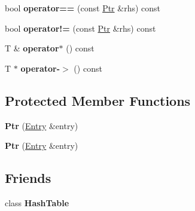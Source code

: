 \begin{DoxyCompactItemize}
\item 
\hypertarget{classjs_1_1detail_1_1_hash_table_1_1_ptr_acf66118cae167ff6aa0ae599e747eef4}{bool {\bfseries operator==} (const \hyperlink{classjs_1_1detail_1_1_hash_table_1_1_ptr}{Ptr} \&rhs) const }\label{classjs_1_1detail_1_1_hash_table_1_1_ptr_acf66118cae167ff6aa0ae599e747eef4}

\item 
\hypertarget{classjs_1_1detail_1_1_hash_table_1_1_ptr_a3fdfbcc06199bfaabc64923fd62328e7}{bool {\bfseries operator!=} (const \hyperlink{classjs_1_1detail_1_1_hash_table_1_1_ptr}{Ptr} \&rhs) const }\label{classjs_1_1detail_1_1_hash_table_1_1_ptr_a3fdfbcc06199bfaabc64923fd62328e7}

\item 
\hypertarget{classjs_1_1detail_1_1_hash_table_1_1_ptr_ab0b57a0fcf51bc62b3d21a8d1b746990}{T \& {\bfseries operator$\ast$} () const }\label{classjs_1_1detail_1_1_hash_table_1_1_ptr_ab0b57a0fcf51bc62b3d21a8d1b746990}

\item 
\hypertarget{classjs_1_1detail_1_1_hash_table_1_1_ptr_acc6d2baeb0eb449dc013088e7805f049}{T $\ast$ {\bfseries operator-\/$>$} () const }\label{classjs_1_1detail_1_1_hash_table_1_1_ptr_acc6d2baeb0eb449dc013088e7805f049}

\end{DoxyCompactItemize}
\subsection*{Protected Member Functions}
\begin{DoxyCompactItemize}
\item 
\hypertarget{classjs_1_1detail_1_1_hash_table_1_1_ptr_aa5f167c08019debfa68a9bbcfa2c5d0a}{{\bfseries Ptr} (\hyperlink{classjs_1_1detail_1_1_hash_table_entry}{Entry} \&entry)}\label{classjs_1_1detail_1_1_hash_table_1_1_ptr_aa5f167c08019debfa68a9bbcfa2c5d0a}

\item 
\hypertarget{classjs_1_1detail_1_1_hash_table_1_1_ptr_aa5f167c08019debfa68a9bbcfa2c5d0a}{{\bfseries Ptr} (\hyperlink{classjs_1_1detail_1_1_hash_table_entry}{Entry} \&entry)}\label{classjs_1_1detail_1_1_hash_table_1_1_ptr_aa5f167c08019debfa68a9bbcfa2c5d0a}

\end{DoxyCompactItemize}
\subsection*{Friends}
\begin{DoxyCompactItemize}
\item 
\hypertarget{classjs_1_1detail_1_1_hash_table_1_1_ptr_a0d65cc1d3f862388016ca21139b4659a}{class {\bfseries Hash\-Table}}\label{classjs_1_1detail_1_1_hash_table_1_1_ptr_a0d65cc1d3f862388016ca21139b4659a}

\end{DoxyCompactItemize}
